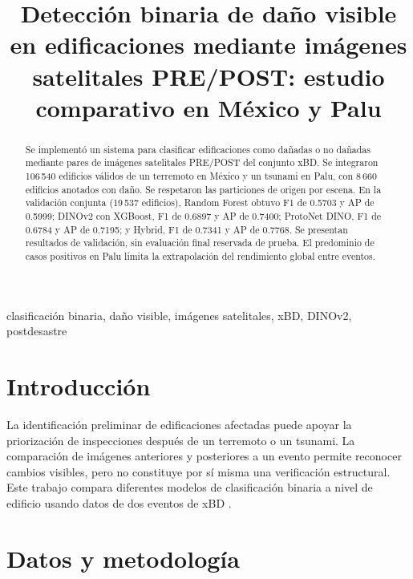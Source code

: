 \documentclass[conference]{IEEEtran}
\begin{document}
\title{Detección binaria de daño visible en edificaciones mediante imágenes satelitales PRE/POST: estudio comparativo en México y Palu}
\author{
}
\maketitle
\begin{abstract}
Se implementó un sistema para clasificar edificaciones como dañadas o no dañadas mediante pares de imágenes satelitales PRE/POST del conjunto xBD. Se integraron 106\,540 edificios válidos de un terremoto en México y un tsunami en Palu, con 8\,660 edificios anotados con daño. Se respetaron las particiones de origen por escena. En la validación conjunta (19\,537 edificios), Random Forest obtuvo F1 de 0.5703 y AP de 0.5999; DINOv2 con XGBoost, F1 de 0.6897 y AP de 0.7400; ProtoNet DINO, F1 de 0.6784 y AP de 0.7195; y Hybrid, F1 de 0.7341 y AP de 0.7768. Se presentan resultados de validación, sin evaluación final reservada de prueba. El predominio de casos positivos en Palu limita la extrapolación del rendimiento global entre eventos.
\end{abstract}
\begin{IEEEkeywords}
clasificación binaria, daño visible, imágenes satelitales, xBD, DINOv2, postdesastre
\end{IEEEkeywords}
\section{Introducción}
La identificación preliminar de edificaciones afectadas puede apoyar la priorización de inspecciones después de un terremoto o un tsunami. La comparación de imágenes anteriores y posteriores a un evento permite reconocer cambios visibles, pero no constituye por sí misma una verificación estructural. Este trabajo compara diferentes modelos de clasificación binaria a nivel de edificio usando datos de dos eventos de xBD \cite{xbd}.
\section{Datos y metodología}
\end{document}
